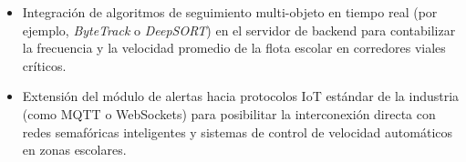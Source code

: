 \documentclass[12pt]{article}
\begin{document}
\begin{enumerate}
\begin{itemize}
        \item Integración de algoritmos de seguimiento multi-objeto en tiempo real (por ejemplo, \emph{ByteTrack} o \emph{DeepSORT}) en el servidor de backend para contabilizar la frecuencia y la velocidad promedio de la flota escolar en corredores viales críticos.
        \item Extensión del módulo de alertas hacia protocolos IoT estándar de la industria (como MQTT o WebSockets) para posibilitar la interconexión directa con redes semafóricas inteligentes y sistemas de control de velocidad automáticos en zonas escolares.
    \end{itemize}
\end{enumerate}


\newpage


\end{document}
